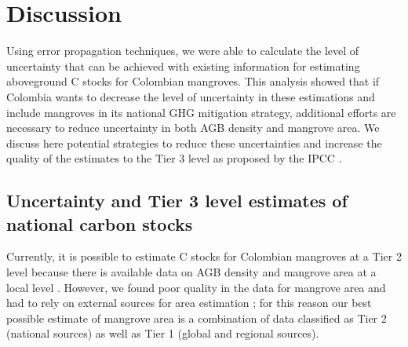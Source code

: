 \documentclass[review, authoryear]{elsarticle}   	%
\begin{document}
\section{Discussion}
Using error propagation techniques, we were able to calculate the level of uncertainty that can be achieved with existing information for estimating aboveground C stocks for Colombian mangroves. This analysis showed that if Colombia wants to decrease the level of uncertainty in these estimations and include mangroves in its national GHG mitigation strategy, additional efforts are necessary to reduce uncertainty in both AGB density and mangrove area. We discuss here potential strategies to reduce these uncertainties and increase the quality of the estimates  to the Tier 3 level  as proposed by the IPCC \citep{IPCC2003, IPCC2006}. 


\subsection {Uncertainty and Tier 3 level estimates of national carbon stocks}



Currently, it is possible to estimate C stocks for Colombian mangroves at a Tier 2 level because there is available data on AGB density and mangrove area at a local level \citep{IPCC2003, IPCC2006}. However, we found poor quality in the data for mangrove area and had to rely on external sources for area estimation \citep[e.g.][]{Giri2010}; for this reason our best possible estimate of mangrove area is a combination of data  classified as Tier 2 (national sources) as well as Tier 1 (global and regional sources). 

\end{document}
